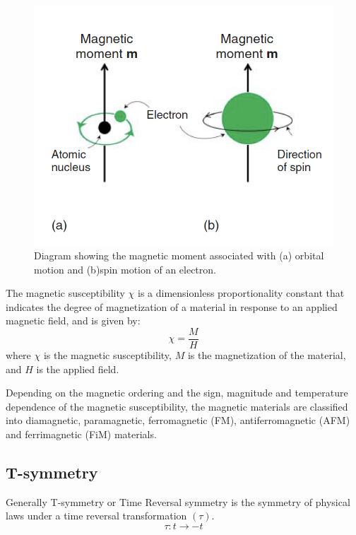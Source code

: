 \begin{figure}[H]
\centering
\captionsetup{justification=centering,margin=2cm}
	\includegraphics{fig/review/electron.png}
	\caption[Diagram showing the magnetic moment associated with orbital and spin motion of an electron.]{Diagram showing the magnetic moment associated with (a) orbital motion and (b)spin motion of an electron.}
\label{fig:electron}
\end{figure}

The magnetic susceptibility $\chi$ is a dimensionless proportionality
constant that indicates the degree of magnetization of a material in response to an applied magnetic field, and is given by:
\begin{equation}
\chi = \frac{M}{H}
\end{equation}
where $\chi$ is the magnetic susceptibility, $M$ is the magnetization of the material, and $H$ is the applied field.

Depending on the magnetic ordering and the sign, magnitude and
temperature dependence of the magnetic susceptibility, the magnetic materials are classified into diamagnetic, paramagnetic, ferromagnetic (FM), antiferromagnetic (AFM) and ferrimagnetic (FiM) materials.

\subsection{T-symmetry}
Generally T-symmetry or Time Reversal symmetry is the symmetry of physical laws under a time reversal transformation $( \tau )$.
\begin{equation}
\tau : t \rightarrow -t
\end{equation}

